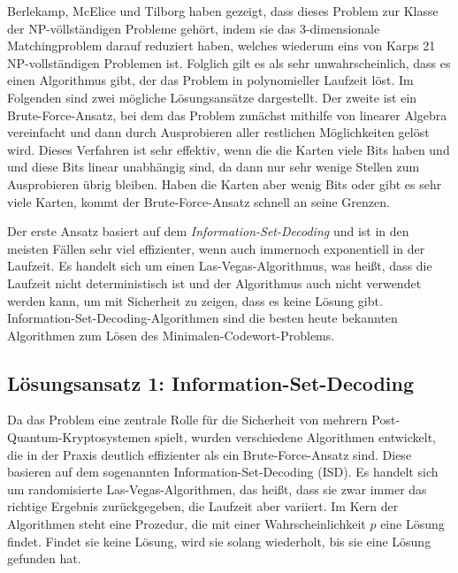 \documentclass[a4paper,10pt,ngerman]{scrartcl}
\begin{document}
Berlekamp, McElice und Tilborg \cite{berlekampInherentIntractabilityCertain1978} haben gezeigt, dass dieses Problem zur Klasse der NP-völlständigen Probleme gehört, indem sie das 3-dimensionale Matchingproblem darauf reduziert haben, welches wiederum eins von Karps 21 NP-vollständigen Problemen ist.
Folglich gilt es als sehr unwahrscheinlich, dass es einen Algorithmus gibt, der das Problem in polynomieller Laufzeit löst. 
Im Folgenden sind zwei mögliche Lösungsansätze dargestellt. 
Der zweite ist ein Brute-Force-Ansatz, bei dem das Problem zunächst mithilfe von linearer Algebra vereinfacht und dann durch Ausprobieren aller restlichen Möglichkeiten gelöst wird.
Dieses Verfahren ist sehr effektiv, wenn die die Karten viele Bits haben und und diese Bits linear unabhängig sind, da dann nur sehr wenige Stellen zum Ausprobieren übrig bleiben. Haben die Karten aber wenig Bits oder gibt es sehr viele Karten, kommt der Brute-Force-Ansatz schnell an seine Grenzen.

Der erste Ansatz basiert auf dem \textit{Information-Set-Decoding} und ist in den meisten Fällen sehr viel effizienter, wenn auch immernoch exponentiell in der Laufzeit. Es handelt sich um einen Las-Vegas-Algorithmus, was heißt, dass die Laufzeit nicht deterministisch ist und der Algorithmus auch nicht verwendet werden kann, um mit Sicherheit zu zeigen, dass es keine Lösung gibt. 
Information-Set-Decoding-Algorithmen sind die besten heute bekannten Algorithmen zum Lösen des Minimalen-Codewort-Problems.

\subsection{Lösungsansatz 1: Information-Set-Decoding}
Da das Problem eine zentrale Rolle für die Sicherheit von mehrern Post-Quantum-Kryptosystemen spielt, wurden verschiedene Algorithmen entwickelt, die in der Praxis deutlich effizienter als ein Brute-Force-Ansatz sind. 
Diese basieren auf dem sogenannten Information-Set-Decoding (ISD). 
Es handelt sich um randomisierte Las-Vegas-Algorithmen, das heißt, dass sie zwar immer das richtige Ergebnis zurückgegeben, die Laufzeit aber variiert. 
Im Kern der Algorithmen steht eine Prozedur, die mit einer Wahrscheinlichkeit $p$ eine Lösung findet. Findet sie keine Lösung, wird sie solang wiederholt, bis sie eine Lösung gefunden hat. 
\end{document}

